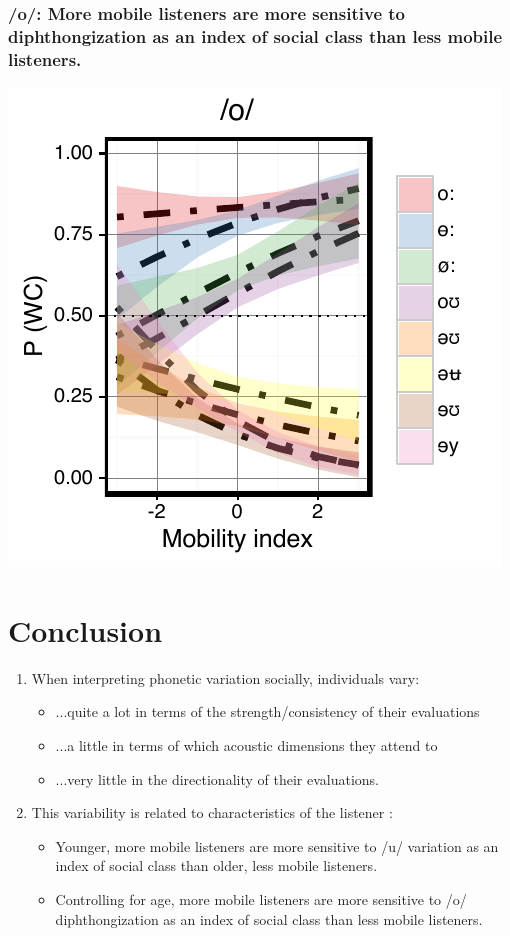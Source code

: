 \documentclass[a0,portrait]{a0poster}
\begin{document}
\begin{multicols}{4}
\subsubsection*{/o/: More mobile listeners are more sensitive to diphthongization as an index of social class than less mobile listeners.}
\centering
\includegraphics[scale=2]{o_perception_dim3_sd.pdf}
\justify
\vspace*{-2.75cm}
\section*{Conclusion}
\vspace*{-.5cm}
\begin{enumerate}
\item{When interpreting phonetic variation socially, individuals vary:\vspace*{0.5cm}\begin{itemize}\item{...quite a lot in terms of the strength/consistency of their evaluations}\item{...a little in terms of which acoustic dimensions they attend to}\item{...very little in the directionality of their evaluations.}\end{itemize}}
\vspace*{0.5cm}
\item{This variability is related to characteristics of the listener :\vspace*{0.5cm}\begin{itemize}\item{Younger, more mobile listeners are more sensitive to /u/ variation as an index of social class than older, less mobile listeners.}\item{Controlling for age, more mobile listeners are more sensitive to /o/ diphthongization as an index of social class than less mobile listeners.}\end{itemize}}
\end{enumerate}


\end{multicols}
\end{document}
